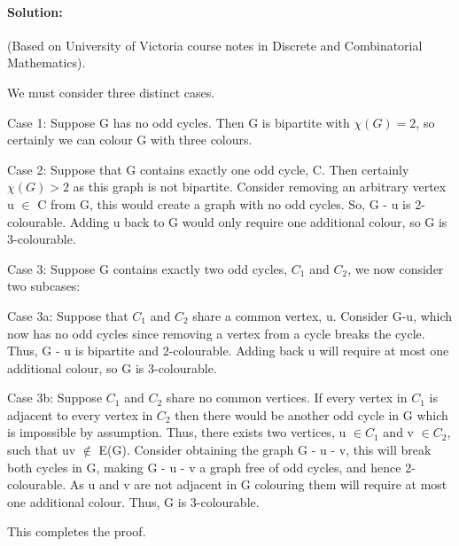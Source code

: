 \documentclass{article}
\begin{document}
\paragraph{Solution:}
(Based on University of Victoria course notes in Discrete and Combinatorial Mathematics).

We must consider three distinct cases.

Case 1: Suppose G has no odd cycles. Then G is bipartite with $\chi(G) = 2$, so certainly we can colour G with three colours.

Case 2: Suppose that G contains exactly one odd cycle, C. Then certainly $\chi(G) > 2$ as this graph is not bipartite. Consider removing an arbitrary vertex u $\in$ C from G, this would create a graph with no odd cycles. So, G - u is 2-colourable. Adding u back to G would only require one additional colour, so G is 3-colourable.

Case 3: Suppose G contains exactly two odd cycles, $C_1$ and $C_2$, we now consider two subcases:

Case 3a: Suppose that $C_1$ and $C_2$ share a common vertex, u. Consider G-u, which now has no odd cycles since removing a vertex from a cycle breaks the cycle. Thus, G - u is bipartite and 2-colourable. Adding back u will require at most one additional colour, so G is 3-colourable.

Case 3b: Suppose $C_1$ and $C_2$ share no common vertices. If every vertex in $C_1$ is adjacent to every vertex in $C_2$ then there would be another odd cycle in G which is impossible by assumption. Thus, there exists two vertices, u $\in C_1$ and v $\in C_2$, such that uv $\notin$ E(G). Consider obtaining the graph G - u - v, this will break both cycles in G, making G - u - v a graph free of odd cycles, and hence 2-colourable. As u and v are not adjacent in G colouring them will require at most one additional colour. Thus, G is 3-colourable.

This completes the proof.
\end{document}
